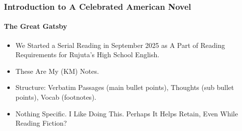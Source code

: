 \begin{frame}
\frametitle{Introduction to A Celebrated American Novel}
\framesubtitle{The Great Gatsby}
\label{slide:intro-01}
\begin{itemize}
\pause
\item We Started a Serial Reading in September 2025 as A Part of Reading Requirements for Rujuta's High School English.
\pause
\item These Are My (KM) Notes.
\pause
\item Structure: Verbatim Passages (main bullet points), Thoughts (sub bullet points), Vocab (footnotes).
\pause
\item Nothing Specific. I Like Doing This. Perhaps It Helps Retain, Even While Reading Fiction?
\end{itemize}
\end{frame}
